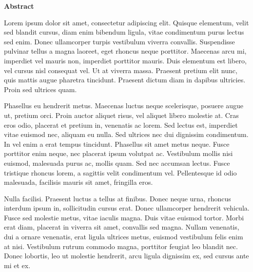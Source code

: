 \thispagestyle{empty}

\begin{center}
\vspace*{4cm}
\textbf{Abstract}
\end{center}

Lorem ipsum dolor sit amet, consectetur adipiscing elit. Quisque elementum, velit sed blandit cursus, diam enim bibendum ligula, vitae condimentum purus lectus sed enim. Donec ullamcorper turpis vestibulum viverra convallis. Suspendisse pulvinar tellus a magna laoreet, eget rhoncus neque porttitor. Maecenas arcu mi, imperdiet vel mauris non, imperdiet porttitor mauris. Duis elementum est libero, vel cursus nisl consequat vel. Ut at viverra massa. Praesent pretium elit nunc, quis mattis augue pharetra tincidunt. Praesent dictum diam in dapibus ultricies. Proin sed ultrices quam.

Phasellus eu hendrerit metus. Maecenas luctus neque scelerisque, posuere augue ut, pretium orci. Proin auctor aliquet risus, vel aliquet libero molestie at. Cras eros odio, placerat et pretium in, venenatis ac lorem. Sed lectus est, imperdiet vitae euismod nec, aliquam eu nulla. Sed ultrices nec dui dignissim condimentum. In vel enim a erat tempus tincidunt. Phasellus sit amet metus neque. Fusce porttitor enim neque, nec placerat ipsum volutpat ac. Vestibulum mollis nisi euismod, malesuada purus ac, mollis quam. Sed nec accumsan lectus. Fusce tristique rhoncus lorem, a sagittis velit condimentum vel. Pellentesque id odio malesuada, facilisis mauris sit amet, fringilla eros.

Nulla facilisi. Praesent luctus a tellus at finibus. Donec neque urna, rhoncus interdum ipsum in, sollicitudin cursus erat. Donec ullamcorper hendrerit vehicula. Fusce sed molestie metus, vitae iaculis magna. Duis vitae euismod tortor. Morbi erat diam, placerat in viverra sit amet, convallis sed magna. Nullam venenatis, dui a ornare venenatis, erat ligula ultrices metus, euismod vestibulum felis enim at nisi. Vestibulum rutrum commodo magna, porttitor feugiat leo blandit nec. Donec lobortis, leo ut molestie hendrerit, arcu ligula dignissim ex, sed cursus ante mi et ex.

\newpage
\afterpage{\blankpage}